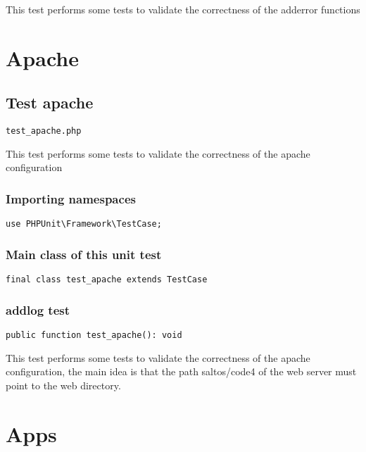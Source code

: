 \documentclass[a4paper]{article}
\begin{document}
This test performs some tests to validate the correctness
of the adderror functions


\hypertarget{toc25}{}
\section{Apache}

\hypertarget{toc26}{}
\subsection{Test apache}

\begin{lstlisting}
test_apache.php
\end{lstlisting}

This test performs some tests to validate the correctness
of the apache configuration

\hypertarget{toc27}{}
\subsubsection{Importing namespaces}

\begin{lstlisting}
use PHPUnit\Framework\TestCase;
\end{lstlisting}

\hypertarget{toc28}{}
\subsubsection{Main class of this unit test}

\begin{lstlisting}
final class test_apache extends TestCase
\end{lstlisting}

\hypertarget{toc29}{}
\subsubsection{addlog test}

\begin{lstlisting}
public function test_apache(): void
\end{lstlisting}

This test performs some tests to validate the correctness of the apache configuration,
the main idea is that the path saltos/code4 of the web server must point to the web
directory.


\hypertarget{toc30}{}
\section{Apps}
\end{document}
